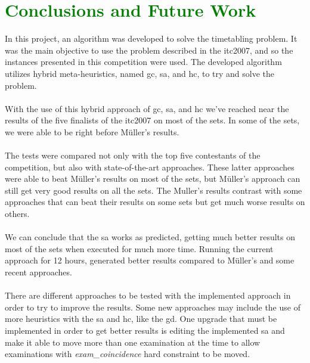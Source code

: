 \chapter{\textcolor{green}{Conclusions and Future Work}}
\label{chap:FutureWork}

In this project, an algorithm was developed to solve the timetabling problem. It was the main objective to use the problem described in the \gls{itc2007}, and so the instances presented in this competition were used. The developed algorithm utilizes hybrid meta-heuristics, named \gls{gc}, \gls{sa}, and \gls{hc}, to try and solve the problem.\\
\\
With the use of this hybrid approach of \gls{gc}, \gls{sa}, and \gls{hc} we've reached near the results of the five finalists of the \gls{itc2007} on most of the sets. In some of the sets, we were able to be right before M\"{u}ller's results.\\
\\
The tests were compared not only with the top five contestants of the competition, but also with state-of-the-art approaches. These latter approaches were able to beat M\"{u}ller's results on most of the sets, but M\"{u}ller's approach can still get very good results on all the sets. The Muller's results contrast with some approaches that can beat their results on some sets but get much worse results on others.\\
\\
We can conclude that the \gls{sa} works as predicted, getting much better results on most of the sets when executed for much more time. Running the current approach for 12 hours, generated better results compared to M\"{u}ller's and some recent approaches.\\
\\
There are different approaches to be tested with the implemented approach in order to try to improve the results. Some new approaches may include the use of more heuristics with the \gls{sa} and \gls{hc}, like the \gls{gd}. One upgrade that must be implemented in order to get better results is editing the implemented \gls{sa} and make it able to move more than one examination at the time to allow examinations with \textit{exam\_coincidence} hard constraint to be moved.
